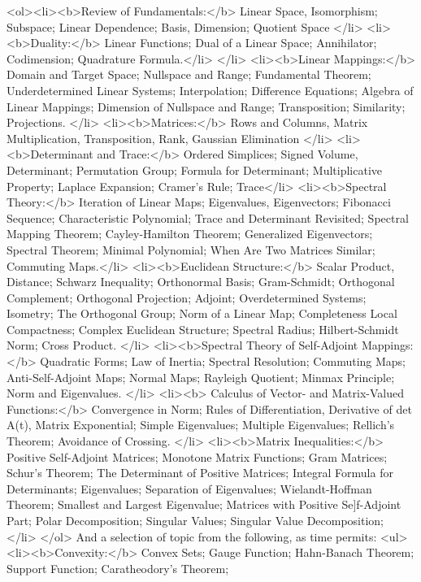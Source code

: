 \documentclass[12pt]{amsart}
\begin{document}
<ol><li><b>Review of Fundamentals:</b>
Linear Space, Isomorphism; Subspace; Linear Dependence; Basis, Dimension; Quotient Space
</li>
<li><b>Duality:</b> Linear Functions; Dual of a Linear Space; Annihilator; Codimension; Quadrature Formula.</li>
</li>
<li><b>Linear Mappings:</b> Domain and Target Space; Nullspace and Range; Fundamental Theorem; Underdetermined Linear Systems; Interpolation; Difference Equations; Algebra of Linear Mappings; Dimension of Nullspace and Range; Transposition; Similarity; Projections.
</li>
<li><b>Matrices:</b> Rows and Columns, Matrix Multiplication, Transposition, Rank, Gaussian Elimination
</li>
<li><b>Determinant and Trace:</b> Ordered Simplices; Signed Volume,  Determinant; Permutation Group; Formula for Determinant; Multiplicative Property; Laplace Expansion; Cramer's Rule; Trace</li>
<li><b>Spectral Theory:</b> Iteration of Linear Maps; Eigenvalues, Eigenvectors; Fibonacci Sequence; Characteristic Polynomial; Trace and Determinant Revisited; Spectral Mapping Theorem; Cayley-Hamilton Theorem; Generalized Eigenvectors; Spectral Theorem; Minimal Polynomial; When Are Two Matrices Similar; Commuting Maps.</li>
<li><b>Euclidean Structure:</b> Scalar Product, Distance; Schwarz Inequality; Orthonormal Basis; Gram-Schmidt; Orthogonal Complement; Orthogonal Projection; Adjoint; Overdetermined Systems; Isometry; The Orthogonal Group; Norm of a Linear Map; Completeness Local Compactness; Complex Euclidean Structure; Spectral Radius; Hilbert-Schmidt Norm; Cross Product.
</li>
<li><b>Spectral Theory of Self-Adjoint Mappings:</b> Quadratic Forms; Law of Inertia; Spectral Resolution; Commuting Maps; Anti-Self-Adjoint Maps; Normal Maps; Rayleigh Quotient; Minmax Principle; Norm and Eigenvalues.
</li>
<li><b>
Calculus of Vector- and Matrix-Valued Functions:</b> Convergence in Norm; Rules of Differentiation, Derivative of det A(t), Matrix Exponential; Simple Eigenvalues; Multiple Eigenvalues; Rellich's Theorem; Avoidance of Crossing.
</li>
<li><b>Matrix Inequalities:</b> Positive Self-Adjoint Matrices;
Monotone Matrix Functions;
Gram Matrices;
Schur's Theorem;
The Determinant of Positive Matrices;
Integral Formula for Determinants;
Eigenvalues;
Separation of Eigenvalues;
Wielandt-Hoffman Theorem;
Smallest and Largest Eigenvalue;
Matrices with Positive Se]f-Adjoint Part;
Polar Decomposition;
Singular Values; 
Singular Value Decomposition; 
</li>
</ol>
And a selection of topic from the following, as time permits:
<ul>
<li><b>Convexity:</b>
Convex Sets;
Gauge Function;
Hahn-Banach Theorem;
Support Function;
Caratheodory's Theorem;
\end{document}
